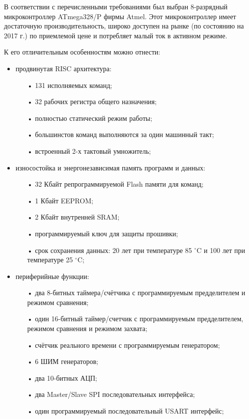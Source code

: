 В соответствии с перечисленными требованиями был выбран 8-разрядный микроконтроллер ATmega328/P фирмы Atmel. Этот микроконтроллер имеет достаточную производительность, широко доступен на рынке (по состоянию на 2017 г.) по приемлемой цене и потребляет малый ток в активном режиме.

К его отличительным особенностям можно отнести\cite{atmegainfo}:
\begin{itemize}
	\item продвинутая RISC архитектура:
	\begin{itemize}
		\item[•] 131 исполняемых команд;
		\item[•] 32 рабочих регистра общего назначения;
		\item[•] полностью статический режим работы;
		\item[•] большинстов команд выполняются за один машинный такт;
		\item[•] встроенный 2-х тактовый умножитель;
	\end{itemize}
	\item износостойка и энергонезависимая память программ и данных:
	\begin{itemize}
		\item[•] 32 Кбайт репрограммируемой Flash памяти для команд;
		\item[•] 1 Кбайт EEPROM;
		\item[•] 2 Кбайт внутренней SRAM;
		\item[•] программируемый ключ для защиты прошивки;
		\item[•] срок сохранения данных: 20 лет при температуре 85 $^{\circ}$C и 100 лет при температуре 25 $^{\circ}$C;
	\end{itemize}
	\item периферийные функции:
	\begin{itemize}
		\item[•] два 8-битных таймера/счётчика с программируемым предделителем и режимом сравнения;
		\item[•] один 16-битный таймер/счетчик с программируемым предделителем, режимом сравнения и режимом захвата;
		\item[•] счётчик реального времени с программируемым генератором;
		\item[•] 6 ШИМ генераторов;
		\item[•] два 10-битных АЦП;
		\item[•] два Master/Slave SPI последовательных интерфейса;
		\item[•] один программируемый последовательный USART интерфейс;

\end{itemize}
\end{itemize}
